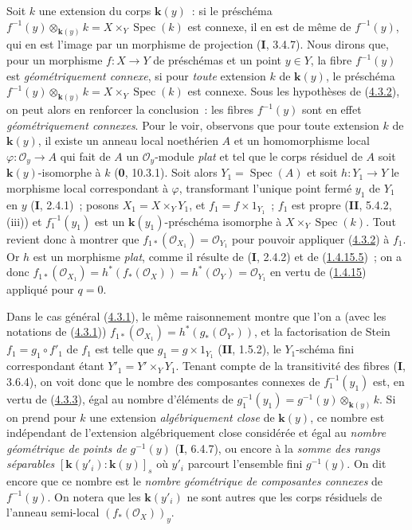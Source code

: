 \begin{remark}[4.3.4]
\label{III.4.3.4-fr}
Soit $k$ une extension du corps $\boldsymbol{k}(y)$~: si le préschéma
$f^{-1}(y)\otimes_{\boldsymbol{k}(y)}k=X\times_Y\operatorname{Spec}(k)$
est connexe, il en est de même de $f^{-1}(y)$, qui en est l'image par un
morphisme de projection (\textbf{I}, 3.4.7). Nous dirons que, pour un morphisme
$f:X\to Y$ de préschémas et un point $y\in Y$, la fibre $f^{-1}(y)$ est
\emph{géométriquement connexe}, si pour \emph{toute} extension $k$ de $\boldsymbol{k}(y)$, le
préschéma
$f^{-1}(y)\otimes_{\boldsymbol{k}(y)}k=X\times_Y\operatorname{Spec}(k)$ est connexe.
Sous les hypothèses de (\hyperref[III.4.3.2-fr]{4.3.2}), on peut alors en
renforcer la conclusion~: les fibres $f^{-1}(y)$ sont en effet
\emph{géométriquement connexes}. Pour le voir, observons que pour toute
extension $k$ de $\boldsymbol{k}(y)$, il existe un anneau local noethérien $A$ et un
homomorphisme local $\varphi:\mathcal O_y\to A$ qui fait de $A$ un
$\mathcal O_y$-module \emph{plat} et tel que le corps résiduel de $A$ soit
$\boldsymbol{k}(y)$-isomorphe à $k$ (\textbf{0}, 10.3.1). Soit alors
$Y_1=\operatorname{Spec}(A)$ et soit $h:Y_1\to Y$ le morphisme local
correspondant à $\varphi$, transformant l'unique point fermé $y_1$ de $Y_1$
en $y$ (\textbf{I}, 2.4.1)~; posons
$X_1=X\times_YY_1$, et $f_1=f\times1_{Y_1}$~; $f_1$ est propre
(\textbf{II}, 5.4.2, (iii)) et $f_1^{-1}(y_1)$ est un $\boldsymbol{k}(y_1)$-préschéma isomorphe à
$X\times_Y\operatorname{Spec}(k)$. Tout revient donc à montrer que
$f_{1*}(\mathcal O_{X_1})=\mathcal O_{Y_1}$ pour pouvoir appliquer
(\hyperref[III.4.3.2-fr]{4.3.2}) à $f_1$. Or $h$ est un morphisme \emph{plat},
comme il résulte de (\textbf{I}, 2.4.2) et de
(\hyperref[III.1.4.15-fr]{1.4.15.5})~; on a donc
$f_{1*}(\mathcal O_{X_1})
=h^*(f_*(\mathcal O_X))
=h^*(\mathcal O_Y)
=\mathcal O_{Y_1}$
en vertu de (\hyperref[III.1.4.15-fr]{1.4.15}) appliqué pour $q=0$.

Dans le cas général (\hyperref[III.4.3.1-fr]{4.3.1}), le même raisonnement
montre que l'on a (avec les notations de
(\hyperref[III.4.3.1-fr]{4.3.1}))
$f_{1*}(\mathcal O_{X_1})=h^*(g_*(\mathcal O_{Y'}))$,
et la factorisation de Stein $f_1=g_1\circ f'_1$ de $f_1$ est telle que
$g_1=g\times1_{Y_1}$ (\textbf{II}, 1.5.2), le $Y_1$-schéma fini correspondant étant
$Y'_1=Y'\times_YY_1$. Tenant compte de la transitivité des fibres
(\textbf{I}, 3.6.4), on voit donc que le nombre des composantes connexes de
$f_1^{-1}(y_1)$ est, en vertu de
(\hyperref[III.4.3.3-fr]{4.3.3}), égal au nombre d'éléments de
$g_1^{-1}(y_1)=g^{-1}(y)\otimes_{\boldsymbol{k}(y)}k$.
Si on prend pour $k$ une extension \emph{algébriquement close} de $\boldsymbol{k}(y)$, ce nombre
est indépendant de l'extension algébriquement close considérée et égal au
\emph{nombre géométrique de points de} $g^{-1}(y)$ (\textbf{I}, 6.4.7), ou encore à
la \emph{somme des rangs séparables}
$[\boldsymbol{k}(y'_i):\boldsymbol{k}(y)]_s$
où $y'_i$ parcourt l'ensemble fini $g^{-1}(y)$. On dit encore que ce nombre
est le \emph{nombre géométrique de composantes connexes} de $f^{-1}(y)$. On
notera que les $\boldsymbol{k}(y'_i)$ ne sont autres que les corps résiduels de l'anneau
semi-local $(f_*(\mathcal O_X))_y$.
\end{remark}

